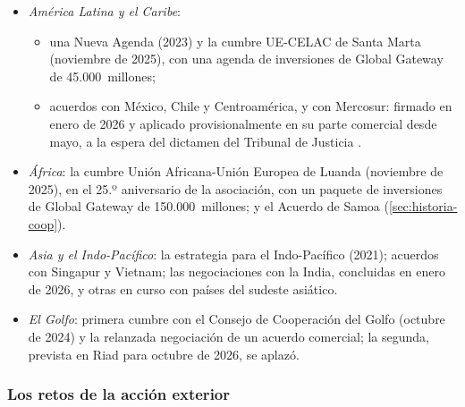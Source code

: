 \documentclass[11pt]{article}
\begin{document}
\begin{itemize}
\item \emph{América Latina y el Caribe}:
  \begin{itemize}
  \item una Nueva Agenda (2023) y la cumbre UE-CELAC de Santa Marta (noviembre de 2025), con una agenda de inversiones de Global Gateway de 45.000~millones;
  \item acuerdos con México, Chile y Centroamérica, y con Mercosur: firmado en enero de 2026 y aplicado provisionalmente en su parte comercial desde mayo, a la espera del dictamen del Tribunal de Justicia .
  \end{itemize}
\item \emph{África}: la cumbre Unión Africana-Unión Europea de Luanda (noviembre de 2025), en el 25.º aniversario de la asociación, con un paquete de inversiones de Global Gateway de 150.000~millones; y el Acuerdo de Samoa (\ref{sec:historia-coop}).
\item \emph{Asia y el Indo-Pacífico}: la estrategia para el Indo-Pacífico (2021); acuerdos con Singapur y Vietnam; las negociaciones con la India, concluidas en enero de 2026, y otras en curso con países del sudeste asiático.
\item \emph{El Golfo}: primera cumbre con el Consejo de Cooperación del Golfo (octubre de 2024) y la relanzada negociación de un acuerdo comercial; la segunda, prevista en Riad para octubre de 2026, se aplazó.
\end{itemize}

\subsubsection{Los retos de la acción exterior}\label{sec:retos-exterior}
\end{document}
